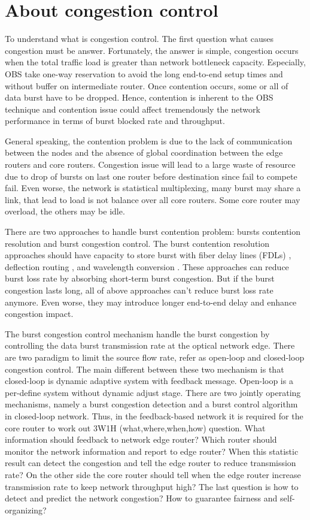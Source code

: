 \section{About congestion control}
To understand what is congestion control. The first question what causes congestion must be answer. Fortunately, the answer is simple, congestion occurs when the total traffic load is greater than network bottleneck capacity. Especially, OBS take one-way reservation to avoid the long end-to-end setup times and without buffer on intermediate router. Once contention occurs, some or all of data burst have to be dropped. Hence, contention is inherent to the OBS technique and
contention issue could affect tremendously the network performance in terms of burst blocked rate and throughput.

General speaking, the contention problem is due to the lack of communication between the nodes and the absence of global coordination between the edge routers and core routers. Congestion issue will lead to a large waste of resource due to drop of bursts on last one router before destination since fail to compete fail. Even worse, the network is statistical multiplexing, many burst may share a link, that lead to load is not balance over all core routers. Some core router may
overload, the others may be idle.  

There are two approaches to handle burst contention problem: bursts contention resolution and burst congestion control. The burst contention resolution approaches should have capacity to store burst with fiber delay lines (FDLs) \cite{fdl}, deflection routing \cite{deflection}, and wavelength conversion \cite{wavelenghtconv}. These approaches can reduce burst loss rate by absorbing short-term burst congestion. But if the burst congestion lasts long, all of above
approaches can't reduce burst loss rate anymore. Even worse, they may introduce longer end-to-end delay and enhance congestion impact. 

The burst congestion control mechanism handle the burst congestion by controlling the data burst transmission rate at the optical network edge. There are two paradigm to limit the source flow rate, refer as open-loop and closed-loop congestion control. The main different between these two mechanism is that closed-loop is dynamic adaptive system with feedback message. Open-loop is a per-define system without dynamic adjust stage.  There are two jointly operating mechanisms, namely a
burst congestion detection and a burst control algorithm in closed-loop network\cite{longterm}. Thus, in the feedback-based network it is required for the core router to work out 3W1H (what,where,when,how) question. What information should feedback to network edge router? Which router should monitor the network information and report to edge router? When this statistic result can detect the congestion and tell the edge router to reduce transmission
rate? On the other side the core router should tell when the edge router increase transmission rate to keep network throughput high? The last question is how to detect and predict the network congestion? How to guarantee fairness and self-organizing? 

